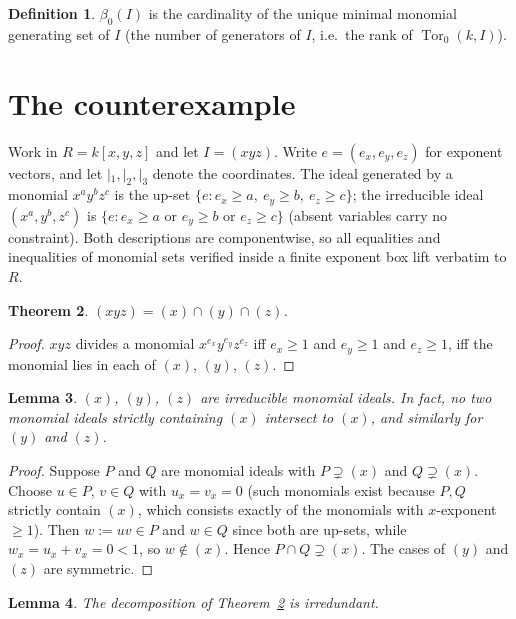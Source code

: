 \documentclass[11pt]{article}
\newtheorem{theorem}{Theorem}
\newtheorem{lemma}[theorem]{Lemma}
\theoremstyle{definition}
\newtheorem{definition}[theorem]{Definition}
\theoremstyle{remark}
\begin{document}
\begin{definition}\label{def:beta0}
$\beta_0(I)$ is the cardinality of the unique minimal monomial generating set
of $I$ (the number of generators of $I$, i.e.\ the rank of
$\operatorname{Tor}_0(k,I)$).
\end{definition}

\section{The counterexample}

Work in $R=k[x,y,z]$ and let $I=(xyz)$. Write $e=(e_x,e_y,e_z)$ for exponent
vectors, and let $|_1,|_2,|_3$ denote the coordinates. The ideal generated by a
monomial $x^a y^b z^c$ is the up-set $\{e : e_x\ge a,\ e_y\ge b,\ e_z\ge c\}$;
the irreducible ideal $(x^a,y^b,z^c)$ is
$\{e : e_x\ge a \text{ or } e_y\ge b \text{ or } e_z\ge c\}$ (absent variables
carry no constraint). Both descriptions are componentwise, so all equalities
and inequalities of monomial sets verified inside a finite exponent box lift
verbatim to $R$.

\begin{theorem}\label{thm:decomposition}
$(xyz)=(x)\cap(y)\cap(z)$.
\end{theorem}

\begin{proof}
$xyz$ divides a monomial $x^{e_x}y^{e_y}z^{e_z}$ iff $e_x\ge1$ and $e_y\ge1$
and $e_z\ge1$, iff the monomial lies in each of $(x)$, $(y)$, $(z)$.
\end{proof}

\begin{lemma}\label{lem:irreducible}
$(x)$, $(y)$, $(z)$ are irreducible monomial ideals. In fact, no two monomial
ideals strictly containing $(x)$ intersect to $(x)$, and similarly for $(y)$
and $(z)$.
\end{lemma}

\begin{proof}
Suppose $P$ and $Q$ are monomial ideals with $P\supsetneq(x)$ and
$Q\supsetneq(x)$. Choose $u\in P$, $v\in Q$ with $u_x=v_x=0$ (such monomials
exist because $P,Q$ strictly contain $(x)$, which consists exactly of the
monomials with $x$-exponent $\ge1$). Then $w:=uv\in P$ and $w\in Q$ since both
are up-sets, while $w_x=u_x+v_x=0<1$, so $w\notin(x)$. Hence
$P\cap Q\supsetneq(x)$. The cases of $(y)$ and $(z)$ are symmetric.
\end{proof}

\begin{lemma}\label{lem:irredundant}
The decomposition of Theorem~\ref{thm:decomposition} is irredundant.
\end{lemma}
\end{document}
